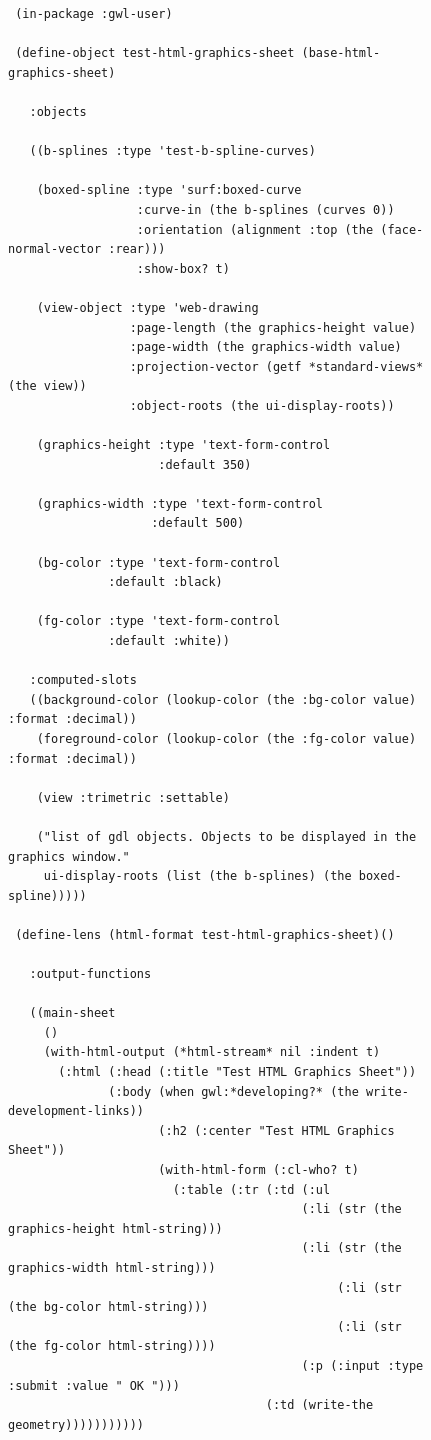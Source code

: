 \documentclass [11pt]{book}
\begin{document}
\begin{itemize}
\begin{figure}
\begin{lrbox}{\boxedverb}
\begin{minipage}{\linewidth}
{\begin{verbatim}
 (in-package :gwl-user)

 (define-object test-html-graphics-sheet (base-html-graphics-sheet)
    
   :objects 

   ((b-splines :type 'test-b-spline-curves)
   
    (boxed-spline :type 'surf:boxed-curve
                  :curve-in (the b-splines (curves 0))
                  :orientation (alignment :top (the (face-normal-vector :rear)))
                  :show-box? t)

    (view-object :type 'web-drawing
                 :page-length (the graphics-height value)
                 :page-width (the graphics-width value)
                 :projection-vector (getf *standard-views* (the view))
                 :object-roots (the ui-display-roots))
   
    (graphics-height :type 'text-form-control
                     :default 350)
   
    (graphics-width :type 'text-form-control
                    :default 500)
   
    (bg-color :type 'text-form-control
              :default :black)
   
    (fg-color :type 'text-form-control
              :default :white))
     
   :computed-slots
   ((background-color (lookup-color (the :bg-color value) :format :decimal))
    (foreground-color (lookup-color (the :fg-color value) :format :decimal))
     
    (view :trimetric :settable)
   
    ("list of gdl objects. Objects to be displayed in the graphics window."
     ui-display-roots (list (the b-splines) (the boxed-spline)))))

 (define-lens (html-format test-html-graphics-sheet)()
   
   :output-functions

   ((main-sheet
     ()
     (with-html-output (*html-stream* nil :indent t)
       (:html (:head (:title "Test HTML Graphics Sheet"))
              (:body (when gwl:*developing?* (the write-development-links))
                     (:h2 (:center "Test HTML Graphics Sheet"))
                     (with-html-form (:cl-who? t)
                       (:table (:tr (:td (:ul 
                                         (:li (str (the graphics-height html-string)))
                                         (:li (str (the graphics-width html-string)))
                                              (:li (str (the bg-color html-string)))
                                              (:li (str (the fg-color html-string))))
                                         (:p (:input :type :submit :value " OK ")))
                                    (:td (write-the geometry)))))))))))


\end{verbatim}}
\end{minipage}
\end{lrbox}
\end{figure}
\end{itemize}
\end{document}
